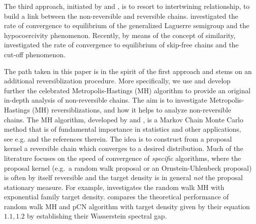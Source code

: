 \documentclass[12pt,a4]{amsart}
\numberwithin{equation}{section}
\theoremstyle{plain}
\theoremstyle{definition}
\theoremstyle{remark}
\newcommand{\1}{\mathds{1}}
\begin{document}
The third approach, initiated by \cite{Patie-Savov} and \cite{Miclo2016}, is to resort to  intertwining relationship, to build a link between the non-reversible and reversible chains. \cite{Patie-Savov} investigated the rate of convergence to equilibrium of the generalized Laguerre semigroup and the hypocoercivity phenomenon. Recently, by means of the concept of similarity, \cite{Choi-Patie} investigated the rate of convergence to equilibrium of skip-free chains and the cut-off phenomenon.

The path taken in this paper is in the spirit of the first approach and stems on an additional reversiblization procedure. More specifically, we use and develop further  the celebrated Metropolis-Hastings (MH) algorithm   to provide an original in-depth analysis of non-reversible chains. The aim is to investigate Metropolis-Hastings (MH) reversiblizations, and how it helps to analyze non-reversible chains. The MH algorithm, developed by \cite{M53} and \cite{H70}, is a Markov Chain Monte Carlo method that is of fundamental importance in statistics and other applications, see e.g. \cite{RR04} and the references therein. The idea is to construct from a proposal kernel a reversible chain which converges to a desired distribution. Much of the literature focuses on the speed of convergence of \textit{specific} algorithms, where the proposal kernel (e.g.~a random walk proposal or an Ornstein-Uhlenbeck proposal) is often by itself reversible and the target density is in general \textit{not} the proposal stationary measure. For example, \cite{RT96} investigates the random walk MH with exponential family target density. \cite{HSV14} compares the theoretical performance of random walk MH and pCN algorithm with target density given by their equation $1.1,1.2$ by establishing their Wasserstein spectral gap.
\end{document}
